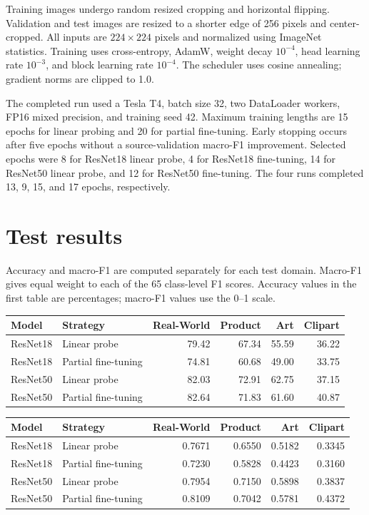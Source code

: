 \documentclass{article}
\begin{document}
Training images undergo random resized cropping and horizontal flipping. Validation and test images are resized to a shorter edge of 256 pixels and center-cropped. All inputs are $224\times224$ pixels and normalized using ImageNet statistics. Training uses cross-entropy, AdamW, weight decay $10^{-4}$, head learning rate $10^{-3}$, and block learning rate $10^{-4}$. The scheduler uses cosine annealing; gradient norms are clipped to 1.0.

The completed run used a Tesla T4, batch size 32, two DataLoader workers, FP16 mixed precision, and training seed 42. Maximum training lengths are 15 epochs for linear probing and 20 for partial fine-tuning. Early stopping occurs after five epochs without a source-validation macro-F1 improvement. Selected epochs were 8 for ResNet18 linear probe, 4 for ResNet18 fine-tuning, 14 for ResNet50 linear probe, and 12 for ResNet50 fine-tuning. The four runs completed 13, 9, 15, and 17 epochs, respectively.

\section{Test results}
Accuracy and macro-F1 are computed separately for each test domain. Macro-F1 gives equal weight to each of the 65 class-level F1 scores. Accuracy values in the first table are percentages; macro-F1 values use the 0--1 scale.

\begin{center}
\begin{tabular}{llrrrr}
\hline
Model & Strategy & Real-World & Product & Art & Clipart \\
\hline
ResNet18 & Linear probe & 79.42 & 67.34 & 55.59 & 36.22 \\
ResNet18 & Partial fine-tuning & 74.81 & 60.68 & 49.00 & 33.75 \\
ResNet50 & Linear probe & 82.03 & 72.91 & 62.75 & 37.15 \\
ResNet50 & Partial fine-tuning & 82.64 & 71.83 & 61.60 & 40.87 \\
\hline
\end{tabular}

\medskip
\begin{tabular}{llrrrr}
\hline
Model & Strategy & Real-World & Product & Art & Clipart \\
\hline
ResNet18 & Linear probe & 0.7671 & 0.6550 & 0.5182 & 0.3345 \\
ResNet18 & Partial fine-tuning & 0.7230 & 0.5828 & 0.4423 & 0.3160 \\
ResNet50 & Linear probe & 0.7954 & 0.7150 & 0.5898 & 0.3837 \\
ResNet50 & Partial fine-tuning & 0.8109 & 0.7042 & 0.5781 & 0.4372 \\
\hline
\end{tabular}
\end{center}
\end{document}
